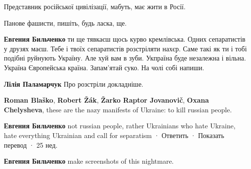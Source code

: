 \begin{itemize}
Представник російської цивілізації, мабуть, має жити в Росії.

 
Панове фашисти, пишіть, будь ласка, ще.

\begin{itemize}
 
\textbf{Евгения Бильченко} ти ще тявкаєш щось курво кремлівська. Одних сепаратистів у друзях маєш. Тебе і твоїх сепаратистів розстріляти нахєр. Саме такі як ти і тобі подібні руйнують Україну. Але хуй вам в зуби. Укпраїна буде незалежна і вільна. Україна Європейська країна. Запам'ятай суко. На чолі собі напиши.

 
\textbf{Лілія Паламарчук} Про розстріли докладніше. 

\textbf{Roman Blaško}, \textbf{Robert Žák}, \textbf{Žarko Raptor Jovanovič}, \textbf{Oxana Chelysheva}, 
these are the nazy manifests of Ukraine: to kill russian people.

 
\textbf{Евгения Бильченко} not russian people, rather Ukrainians who hate Ukraine, hate everything Ukrainian and call for separatism
 · Ответить · Показать перевод · 25 нед.
 
\textbf{Евгения Бильченко} make screenshots of this nightmare.

 

\end{itemize}
\end{itemize}
